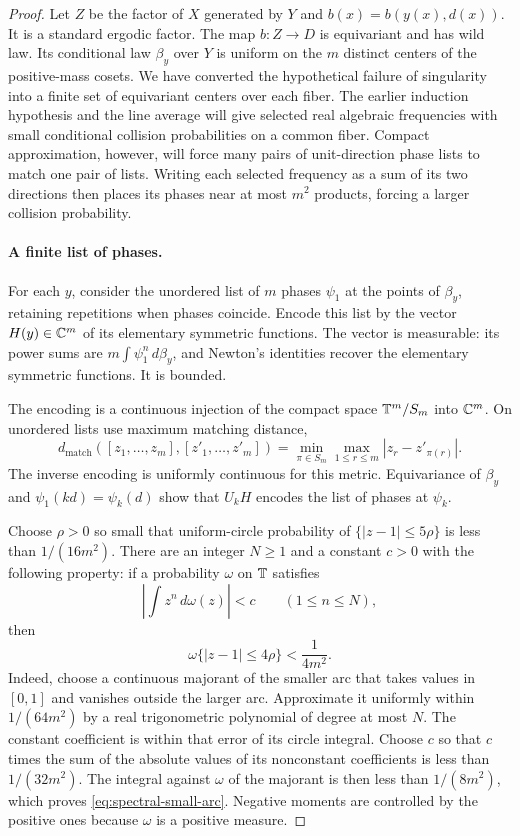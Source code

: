 \begin{proof}
Let $Z$ be the factor of $X$ generated by $Y$ and
$b(x)=b(y(x),d(x))$. It is a standard ergodic factor. The map
$b:Z\to D$ is equivariant and has wild law. Its conditional law
$\beta_y$ over $Y$ is uniform on the $m$ distinct centers of the
positive-mass cosets. We have converted the hypothetical failure of
singularity into a finite set of equivariant centers over each fiber.
The earlier induction hypothesis and the line average will give
selected real algebraic frequencies with small conditional collision
probabilities on a common fiber.  Compact approximation, however, will
force many pairs of unit-direction phase lists to match one pair of
lists.  Writing each selected frequency as a sum of its two directions
then places its phases near at most $m^2$ products, forcing a larger
collision probability.

\paragraph{A finite list of phases.}
For each $y$, consider the unordered list of $m$ phases $\psi_1$ at
the points of $\beta_y$, retaining repetitions when phases coincide.
Encode this list by the vector $H(y)\in\mathbb C^m$ of its elementary
symmetric functions. The vector is measurable: its power sums are
$m\int\psi_1^n\,d\beta_y$, and Newton's identities recover the
elementary symmetric functions. It is bounded.

The encoding is a continuous injection of the compact space
$\mathbb T^m/S_m$ into $\mathbb C^m$. On unordered lists use maximum matching
distance,
\[
 d_{\mathrm{match}}([z_1,\ldots,z_m],[z'_1,\ldots,z'_m])
 =\min_{\pi\in S_m}\max_{1\le r\le m}|z_r-z'_{\pi(r)}|.
\]
The inverse encoding is uniformly continuous for this metric.
Equivariance of $\beta_y$ and $\psi_1(kd)=\psi_k(d)$ show that
$U_kH$ encodes the list of phases at $\psi_k$.

Choose $\rho>0$ so small that uniform-circle probability of
$\{|z-1|\le5\rho\}$ is less than $1/(16m^2)$. There are an integer
$N\ge1$ and a constant $c>0$ with the following property: if a
probability $\omega$ on $\mathbb T$ satisfies
\[
 \left|\int z^n\,d\omega(z)\right|<c\qquad(1\le n\le N),
\]
then
\begin{equation}\label{eq:spectral-small-arc}
 \omega\{|z-1|\le4\rho\}<\frac1{4m^2}.
\end{equation}
Indeed, choose a continuous majorant of the smaller arc that takes
values in $[0,1]$ and vanishes outside the larger arc. Approximate it
uniformly within $1/(64m^2)$ by a real trigonometric polynomial of
degree at most $N$. The constant coefficient is within that error of
its circle integral. Choose $c$ so that $c$ times the sum of the
absolute values of its nonconstant coefficients is less than
$1/(32m^2)$. The integral against $\omega$ of the majorant is then
less than $1/(8m^2)$, which proves
\eqref{eq:spectral-small-arc}. Negative moments are controlled by the
positive ones because $\omega$ is a positive measure.


\end{proof}
